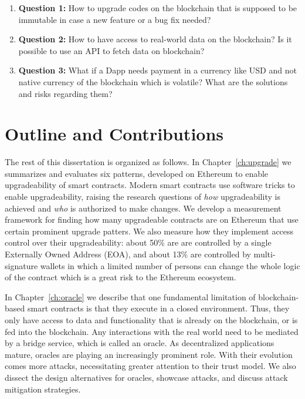 \begin{enumerate}
    \item \textbf{Question 1:} How to upgrade codes on the blockchain that is supposed to be immutable in case a new feature or a bug fix needed?
    \item \textbf{Question 2:} How to have access to real-world data on the blockchain? Is it possible to use an API to fetch data on blockchain?
    \item \textbf{Question 3:} What if a Dapp needs payment in a currency like USD and not native currency of the blockchain which is volatile? What are the solutions and risks regarding them?
\end{enumerate}


\section{Outline and Contributions}
The rest of this dissertation is organized as follows. In Chapter~\ref{ch:upgrade} we summarizes and evaluates six patterns, developed on Ethereum to enable upgradeability of smart contracts. Modern smart contracts use software tricks to enable upgradeability, raising the research questions of \textit{how} upgradeability is achieved and \textit{who} is authorized to make changes. We develop a measurement framework for finding how many upgradeable contracts are on Ethereum that use certain prominent upgrade patters. We also measure how they implement access control over their upgradeability: about 50\% are are controlled by a single Externally Owned Address (EOA), and about 13\% are controlled by multi-signature wallets in which a limited number of persons can change the whole logic of the contract which is a great risk to the Ethereum ecosystem.

In Chapter~\ref{ch:oracle} we describe that one fundamental limitation of blockchain-based smart contracts is that they execute in a closed environment. Thus, they only have access to data and functionality that is already on the blockchain, or is fed into the blockchain. Any interactions with the real world need to be mediated by a bridge service, which is called an oracle. As decentralized applications mature, oracles are playing an increasingly prominent role. With their evolution comes more attacks, necessitating greater attention to their trust model. We also dissect the design alternatives for oracles, showcase attacks, and discuss attack mitigation strategies.



